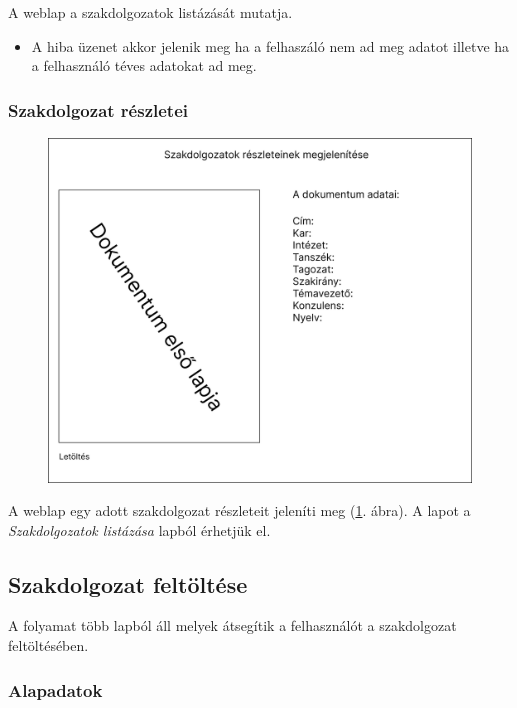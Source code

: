 \documentclass[a4paper,12pt]{article}
\begin{document}
A weblap a szakdolgozatok listázását mutatja.
\begin{itemize}
	\item A hiba üzenet akkor jelenik meg ha a felhaszáló nem ad meg adatot illetve ha a felhasználó téves adatokat ad meg.
\end{itemize}

\subsubsection{Szakdolgozat részletei}

\begin{figure}
	\centering
	\includegraphics[width=\textwidth]{images/Web_pages/Thesis_Details.jpg}
	\caption{}
	\label{fig:Thesis_Details}
\end{figure}

A weblap egy adott szakdolgozat részleteit jeleníti meg (\ref{fig:Thesis_Details}. ábra). A lapot a \textit{Szakdolgozatok listázása} lapból érhetjük el. 

\subsection{Szakdolgozat feltöltése}

A folyamat több lapból áll melyek átsegítik a felhasználót a szakdolgozat feltöltésében.

\subsubsection{Alapadatok}
\end{document}
